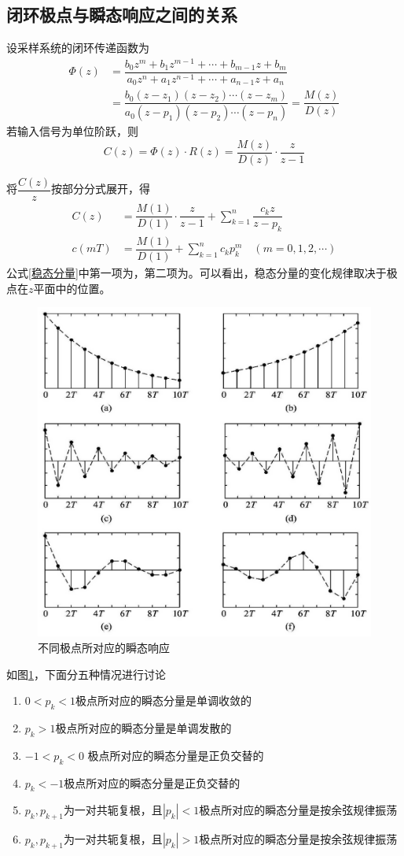 \subsection{闭环极点与瞬态响应之间的关系}
设采样系统的闭环传递函数为
\begin{align}
	\varPhi(z) &= \dfrac{b_0 z^m + b_1 z^{m-1}+\cdots + b_{m-1}z+b_m}{a_0 z^n + a_1 z^{n-1}+\cdots + a_{n-1}z +a_n}\\[0.5em]
	& = \dfrac{b_0(z-z_1)(z-z_2)\cdots(z-z_m)}{a_0(z-p_1)(z-p_2)\cdots(z-p_n)} = \dfrac{M(z)}{D(z)}
\end{align}
若输入信号为单位阶跃，则
\begin{equation}
	C(z) = \varPhi(z)\cdot R(z)  = \dfrac{M(z)}{D(z)}\cdot \dfrac{z}{z-1}
\end{equation}

将$\dfrac{C(z)}{z}$按部分分式展开，得
\begin{align}
	C(z) &= \dfrac{M(1)}{D(1)}\cdot\dfrac{z}{z-1} + \sum_{k=1}^{n} \dfrac{c_kz}{z - p_k}\\
	c(mT) &= \dfrac{M(1)}{D(1)} + \sum_{k=1}^{n}c_kp_k^m \quad (m = 0,1,2,\cdots)
	\label{稳态分量}
\end{align}
公式\eqref{稳态分量}中第一项为，第二项为。可以看出，稳态分量的变化规律取决于极点在$z$平面中的位置。
\begin{figure}[!htb]
	\centering
	\includegraphics[width=0.58\linewidth]{pic/极点与瞬态响应.jpg}
	\vspace*{-1.5em}
	\caption{不同极点所对应的瞬态响应}
	\label{极点与瞬态响应}
\end{figure}

\noindent 如图\ref{极点与瞬态响应}，下面分五种情况进行讨论
\begin{enumerate}[\hspace*{2em}(a) ]
	\item $0<p_k<1$\quad 极点所对应的瞬态分量是单调收敛的
	\item $p_k>1$\quad 极点所对应的瞬态分量是单调发散的
	\item $-1<p_k<0$ \quad 极点所对应的瞬态分量是正负交替的
	\item $p_k<-1$\quad 极点所对应的瞬态分量是正负交替的
	\item $p_k, p_{k+1}$为一对共轭复根，且$|p_k|<1$\quad 极点所对应的瞬态分量是按余弦规律振荡
	\item $p_k, p_{k+1}$为一对共轭复根，且$|p_k|>1$\quad 极点所对应的瞬态分量是按余弦规律振荡
\end{enumerate}
\vspace*{1em}

